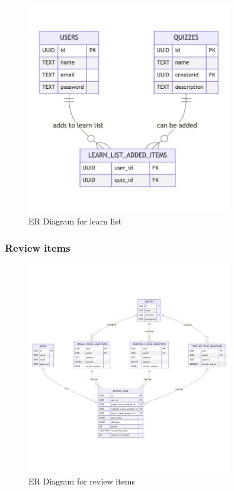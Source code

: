 \begin{figure}[H]
    \centering
    \includegraphics[width=0.8\textwidth, keepaspectratio]{figures/er-learn-list.png}
    \caption{ER Diagram for learn list}
    \label{fig:er-learn-list}
\end{figure}

\subsubsection{Review items}

\begin{figure}[H]
    \centering
    \includegraphics[width=0.8\textwidth, keepaspectratio]{figures/er-review-items.png}
    \caption{ER Diagram for review items}
    \label{fig:er-review items}
\end{figure}

